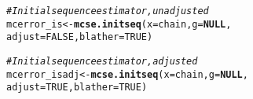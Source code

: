 \documentclass[11pt]{article}\usepackage[]{graphicx}\usepackage[]{color}
\makeatletter
\newcommand{\hlnum}[1]{\textcolor[rgb]{0.686,0.059,0.569}{#1}}%
\newcommand{\hlcom}[1]{\textcolor[rgb]{0.678,0.584,0.686}{\textit{#1}}}%
\newcommand{\hlstd}[1]{\textcolor[rgb]{0.345,0.345,0.345}{#1}}%
\newcommand{\hlkwa}[1]{\textcolor[rgb]{0.161,0.373,0.58}{\textbf{#1}}}%
\newcommand{\hlkwb}[1]{\textcolor[rgb]{0.69,0.353,0.396}{#1}}%
\newcommand{\hlkwc}[1]{\textcolor[rgb]{0.333,0.667,0.333}{#1}}%
\newcommand{\hlkwd}[1]{\textcolor[rgb]{0.737,0.353,0.396}{\textbf{#1}}}%
\newenvironment{kframe}{%
 \def\at@end@of@kframe{}%
 \ifinner\ifhmode%
  \def\at@end@of@kframe{\end{minipage}}%
  \begin{minipage}{\columnwidth}%
 \fi\fi%
 \def\FrameCommand##1{\hskip\@totalleftmargin \hskip-\fboxsep
 \colorbox{shadecolor}{##1}\hskip-\fboxsep
     \hskip-\linewidth \hskip-\@totalleftmargin \hskip\columnwidth}%
 \MakeFramed {\advance\hsize-\width
   \@totalleftmargin\z@ \linewidth\hsize
   \@setminipage}}%
 {\par\unskip\endMakeFramed%
 \at@end@of@kframe}
\newenvironment{knitrout}{}{} %
\makeatother
\begin{document}
\begin{knitrout}
\begin{kframe}
{\ttfamily\noindent\bfseries\color{errorcolor}{\#\# Error in as.matrix(x): object 'chain' not found}}\begin{alltt}
\hlcom{# Initial sequence estimator, unadjusted}
\hlstd{mcerror_is} \hlkwb{<-} \hlkwd{mcse.initseq}\hlstd{(}\hlkwc{x} \hlstd{= chain,} \hlkwc{g} \hlstd{=} \hlkwa{NULL}\hlstd{,}
                           \hlkwc{adjust} \hlstd{=} \hlnum{FALSE}\hlstd{,} \hlkwc{blather} \hlstd{=} \hlnum{TRUE}\hlstd{)}
\end{alltt}


{\ttfamily\noindent\bfseries\color{errorcolor}{\#\# Error in as.matrix(x): object 'chain' not found}}\begin{alltt}
\hlcom{# Initial sequence estimator, adjusted}
\hlstd{mcerror_isadj} \hlkwb{<-} \hlkwd{mcse.initseq}\hlstd{(}\hlkwc{x} \hlstd{= chain,} \hlkwc{g} \hlstd{=} \hlkwa{NULL}\hlstd{,}
                              \hlkwc{adjust} \hlstd{=} \hlnum{TRUE}\hlstd{,} \hlkwc{blather} \hlstd{=} \hlnum{TRUE}\hlstd{)}
\end{alltt}


{\ttfamily\noindent\bfseries\color{errorcolor}{\#\# Error in as.matrix(x): object 'chain' not found}}\end{kframe}
\end{knitrout}
\end{document}
